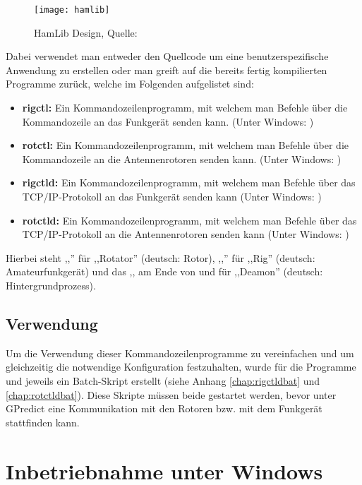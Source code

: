 \begin{figure}[h]
	\centering
	\texttt{[image: hamlib]}
	\caption{HamLib Design, Quelle: \cite{hamlib}}
	\label{fig:hamlib} 
\end{figure}

Dabei verwendet man entweder den Quellcode um eine benutzerspezifische Anwendung zu erstellen oder man greift auf die bereits fertig kompilierten Programme zurück, welche im Folgenden aufgelistet sind:

\begin{itemize}
	\parskip0pt
	\item \textbf{rigctl:} Ein Kommandozeilenprogramm, mit welchem man Befehle über die Kommandozeile an das Funkgerät senden kann. (Unter Windows: )
	\item \textbf{rotctl:} Ein Kommandozeilenprogramm, mit welchem man Befehle über die Kommandozeile an die Antennenrotoren senden kann. (Unter Windows: )
	\item \textbf{rigctld:} Ein Kommandozeilenprogramm, mit welchem man Befehle über das TCP/IP-Protokoll an das Funkgerät senden kann (Unter Windows: )
	\item \textbf{rotctld:}  Ein Kommandozeilenprogramm, mit welchem man Befehle über das TCP/IP-Protokoll an die Antennenrotoren senden kann (Unter Windows: )
\end{itemize}

\clearpage

Hierbei steht ,,'' für ,,Rotator'' (deutsch: Rotor), ,,'' für  ,,Rig'' (deutsch: Amateurfunkgerät) und das ,, am Ende von  und  für ,,Deamon'' (deutsch: Hintergrundprozess).

\subsection{Verwendung}

Um die Verwendung dieser Kommandozeilenprogramme zu vereinfachen und um gleichzeitig die notwendige Konfiguration festzuhalten, wurde für die Programme  und  jeweils ein Batch-Skript erstellt (siehe Anhang \ref{chap:rigctldbat} und \ref{chap:rotctldbat}). Diese Skripte müssen beide gestartet werden, bevor unter GPredict eine Kommunikation mit den Rotoren bzw. mit dem Funkgerät stattfinden kann. 

\section{Inbetriebnahme unter Windows}


